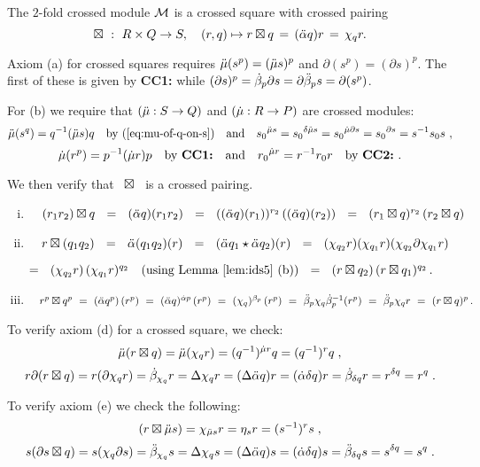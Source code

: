 \begin{prop} \label{prop:xxmod-is-xsq}
The $2$-fold crossed module $\mathcal{M}$ is a crossed square with crossed pairing
$$
\boxtimes ~:~ R \times Q \to S, \quad 
(r,q) \mapsto r \boxtimes q \,=\, (\ddot{\alpha} q)r \,=\, \chi_q r.
$$
\end{prop}

\medskip\noindent
\begin{pf}
Axiom (a) for crossed squares requires  $\ddot{\mu}(s^p) = (\ddot{\mu} s)^p$ 
and  $\partial(s^p) = (\partial s)^p$.
The first of these is given by \textbf{CC1:} 
while $(\partial s)^p = \dot{\beta}_p\partial s = \partial\ddot{\beta}_p s = \partial(s^p)$.

\medskip\noindent
For (b) we require that  $(\ddot{\mu} : S \to Q)$ and $(\dot{\mu} : R \to P)$ 
are crossed modules:
$$
\ddot{\mu}(s^q) = q^{-1}(\ddot{\mu} s)q \quad\mbox{by (\ref{eq:mu-of-q-on-s})\quad and}
\quad {s_0}^{\ddot{\mu} s} = {s_0}^{\delta\ddot{\mu} s} = {s_0}^{\dot{\mu} \partial s}
                     = {s_0}^{\partial s} = s^{-1}s_0s~,
$$
$$
\dot{\mu}(r^p) = p^{-1}(\dot{\mu} r)p \quad\mbox{by \textbf{CC1:}\quad and}
\quad {r_0}^{\dot{\mu} r} = r^{-1}r_0r \quad \mbox{by \textbf{CC2:}}~.
$$

\medskip\noindent
We then verify that ~$\boxtimes$~ is a crossed pairing.
\begin{enumerate}[(i)]
\item
$\quad
(r_1r_2) \boxtimes q  ~~=~~ (\ddot{\alpha} q)(r_1r_2) ~~=~~
((\ddot{\alpha} q)(r_1))^{r_2}\,((\ddot{\alpha} q)(r_2)) ~~=~~ (r_1 \boxtimes q)^{r_2}\,(r_2 \boxtimes q) $
\item
$\quad
r \boxtimes (q_1q_2)  ~~=~~
\ddot{\alpha}(q_1q_2)(r) ~~=~~ (\ddot{\alpha} q_1 \star \ddot{\alpha} q_2)(r) ~~=~~
(\chi_{q_2}r)(\chi_{q_1}r)( \chi_{q_2} \partial \chi_{q_1} r) $

\hspace*{23mm}
$=~~ (\chi_{q_2} r)\,(\chi_{q_1} r)^{q_2} 
\quad\mbox{(using Lemma \ref{lem:ids5} (b))}
~~=~~ (r \boxtimes q_2)\,(r \boxtimes q_1)^{q_2}\,.$
\item
$\quad
r^{p} \boxtimes q^{p}
  ~ = ~  (\ddot{\alpha} q^{p})\,(r^{p})
  ~ = ~  (\ddot{\alpha} q)^{\dot{\alpha} p}\,(r^{p})
  ~ = ~  (\chi_q)^{\beta_p}\,(r^{p}) 
  ~ = ~  \ddot{\beta}_{p} \chi_q {\dot{\beta}_{p}}^{-1} (r^{p})
  ~ = ~  \ddot{\beta}_{p} \chi_q r
  ~ = ~  (r \boxtimes q)^{p}\,.$
\end{enumerate}

\medskip\noindent
To verify axiom (d) for a crossed square, we check:
$$
\ddot{\mu}(r \boxtimes q) = \ddot{\mu}(\chi_q r) = (q^{-1})^{\dot{\mu} r}q = (q^{-1})^rq \;,
$$
$$
r \partial(r \boxtimes q) = r(\partial\chi_q r) = \dot{\beta}_{\chi_q}r = \Delta \chi_q r
= (\Delta \ddot{\alpha} q)r = (\dot{\alpha} \delta q)r  
= \dot{\beta}_{\delta q}r = r^{\delta q} = r^q \;.
$$

\medskip\noindent
To verify axiom (e) we check the following: 
$$
(r \boxtimes \ddot{\mu} s) = \chi_{\ddot{\mu} s}r = \eta_s r = (s^{-1})^r s \;,
$$
$$
s(\partial s \boxtimes q) = s(\chi_q \partial s) = \ddot{\beta}_{\chi_q}s = \Delta \chi_q s
= (\Delta \ddot{\alpha} q)s = (\dot{\alpha} \delta q)s 
= \ddot{\beta}_{\delta q}s = s^{\delta q} = s^q\;.
$$
\end{pf}

